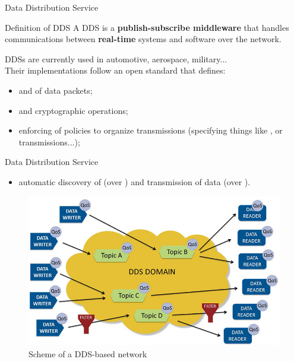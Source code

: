 \begin{frame}{Data Distribution Service}
	\begin{block}{Definition of DDS}
		A DDS is a \textbf{publish-subscribe middleware} that handles communications between \textbf{real-time} systems and software over the network.
	\end{block}
  DDSs are currently used in automotive, aerospace, military...\\
	Their implementations follow an open standard that defines:
	\begin{itemize}
		\item {} and  of data packets;
		\item {} and cryptographic operations;
		\item enforcing of  policies to organize transmissions (specifying things like ,  or  transmissions...);
	\end{itemize}
\end{frame}
\begin{frame}{Data Distribution Service}
  \begin{itemize}
		\item automatic discovery of  (over ) and transmission of data (over ).
  \end{itemize}
	\begin{figure}
		\centering
		\includegraphics[scale=.36]{ddsDomain.jpg}
		\caption{Scheme of a DDS-based network}
		\label{fig:ddsdomain}
	\end{figure}
\end{frame}
